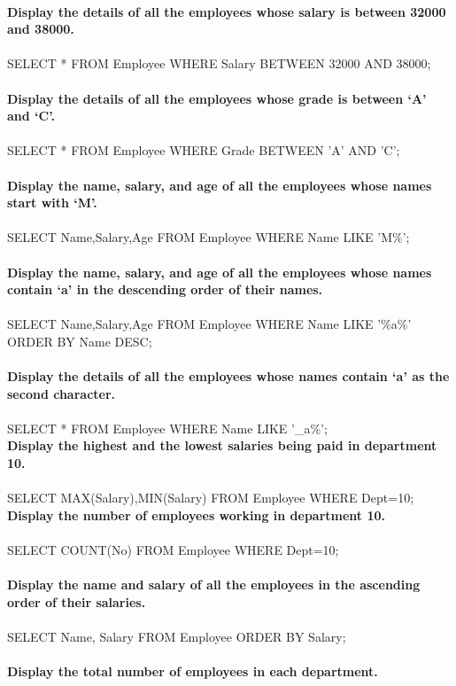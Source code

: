 \documentclass[
a4paper]{article}
\begin{document}
\begin{large}
\\
\textbf{Display the details of all the employees whose salary is between 32000 and 38000.}\\
\\
SELECT * FROM Employee WHERE Salary BETWEEN 32000 AND 38000;\\
\\
\textbf{Display the details of all the employees whose grade is between ‘A’ and ‘C’.}\\
\\
SELECT * FROM Employee WHERE Grade BETWEEN 'A' AND 'C';\\
\\
\textbf{Display the name, salary, and age of all the employees whose names start with ‘M’.}\\
\\
SELECT Name,Salary,Age FROM Employee WHERE Name LIKE 'M\%';\\
\\
\textbf{Display the name, salary, and age of all the employees whose names contain ‘a’ in the descending order of their names.}\\
\\
SELECT Name,Salary,Age FROM Employee WHERE Name LIKE '\%a\%' ORDER BY Name DESC;\\
\\
\textbf{Display the details of all the employees whose names contain ‘a’ as the second character.}\\
\\		
SELECT * FROM Employee WHERE Name LIKE '\_a\%';
\\
\textbf{Display the highest and the lowest salaries being paid in department 10.}\\
\\
SELECT MAX(Salary),MIN(Salary) FROM Employee WHERE Dept=10;
\\
\textbf{Display the number of employees working in department 10.}\\
\\
SELECT COUNT(No) FROM Employee WHERE Dept=10;\\
\\
\textbf{Display the name and salary of all the employees in the ascending order of their salaries.}\\
\\
SELECT Name, Salary FROM Employee ORDER BY Salary;\\
\\
\textbf{Display the total number of employees in each department.}\\

\end{large}
\end{document}
